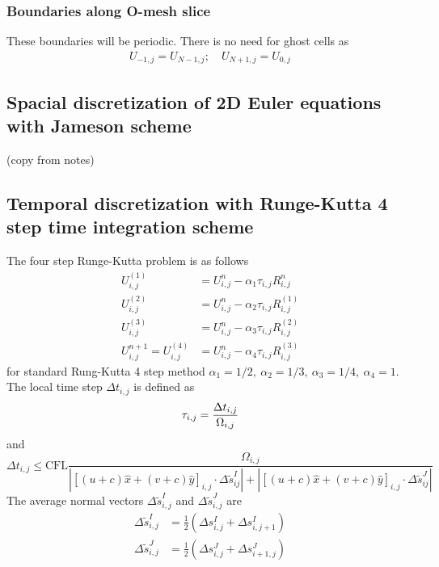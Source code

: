 \documentclass[11pt]{article}
\begin{document}
		\subsubsection{Boundaries along O-mesh slice}
		These boundaries will be periodic. There is no need for ghost cells as
			\begin{align}
			U_{-1,j} = U_{N-1,j}; \quad U_{N+1,j} = U_{0,j}
			\end{align}
	\subsection{Spacial discretization of 2D Euler equations with Jameson scheme}
	(copy from notes)
	
	\subsection{Temporal discretization with Runge-Kutta 4 step time integration scheme}
	The four step Runge-Kutta problem is as follows
		\begin{align}
		U_{i,j}^{(1)} &= U_{i,j}^n - \alpha_1 \tau_{i,j} R_{i,j}^n \\
		U_{i,j}^{(2)} &= U_{i,j}^n - \alpha_2 \tau_{i,j} R_{i,j}^{(1)} \\
		U_{i,j}^{(3)} &= U_{i,j}^n - \alpha_3 \tau_{i,j} R_{i,j}^{(2)} \\
		U_{i,j}^{n+1} = U_{i,j}^{(4)} &= U_{i,j}^n - \alpha_4 \tau_{i,j} R_{i,j}^{(3)} 
		\end{align}
	for standard Rung-Kutta 4 step method $\alpha_1 = 1/2,~\alpha_2 = 1/3,~\alpha_3 = 1/4,~\alpha_4 = 1$.  The local time step $\Delta t_{i,j}$ is defined as
		\begin{equation}
		\tau_{i,j} = \frac{\Delta t_{i,j}}{\Omega_{i,j}} \\
		\end{equation}
	and
		\begin{equation}
		\Delta t_{i,j} \leq \text{CFL} \frac{\Omega_{i,j}}{\left| \left[(u + c)\hat{x} + (v+c)\hat{y}\right]_{i,j}\cdot \Delta \tilde{s}_{ij}^I\right| + \left|  \left[(u + c)\hat{x} + (v+c)\hat{y}\right]_{i,j} \cdot \Delta \tilde{s}_{ij}^J\right|}
		\end{equation}
	The average normal vectors $\Delta\tilde{s}_{i,j}^I$ and $\Delta\tilde{s}_{i,j}^J$ are
		\begin{align}
		\Delta\tilde{s}_{i,j}^I & = \frac{1}{2} \left( \Delta s_{i,j}^I + \Delta s_{i,j+1}^I\right) \\
		\Delta\tilde{s}_{i,j}^J & = \frac{1}{2} \left( \Delta s_{i,j}^J + \Delta s_{i+1,j}^J\right) 
		\end{align}
		
\end{document}
